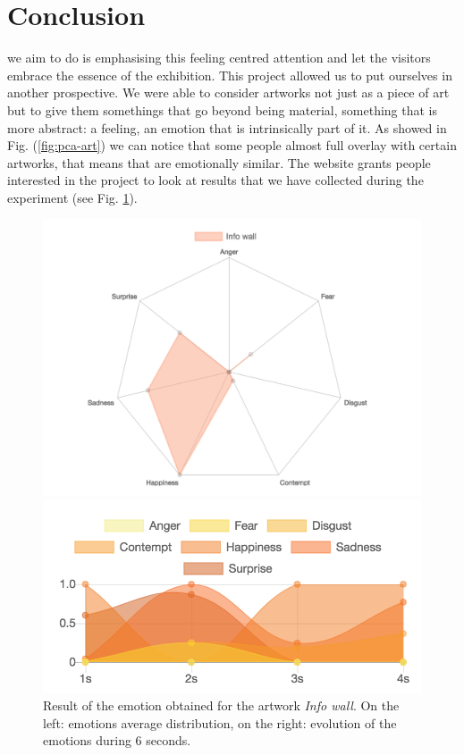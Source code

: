\documentclass[journal, a4paper]{IEEEtran}
\begin{document}
\section{Conclusion}
 we aim to do is emphasising this feeling centred attention and let the visitors embrace the essence of the exhibition. This project allowed us to put ourselves in another prospective. We were able to consider artworks not just as a piece of art but to give them somethings that go beyond being material, something that is more abstract: a feeling, an emotion that is intrinsically part of it. As showed in Fig. (\ref{fig:pca-art}) we can notice that some people almost full overlay with certain artworks, that means that are emotionally similar. The website grants people interested in the project to look at results that we have collected during the experiment (see Fig. \ref{fig:charttime}).
\begin{figure}[!h]
  \centering
  \begin{minipage}[b]{0.24\textwidth}
    \includegraphics[width=\textwidth]{chart.png}
  \end{minipage}
  \hfill
  \begin{minipage}[b]{0.24\textwidth}
    \includegraphics[width=\textwidth]{emot.png}
  \end{minipage}
  \caption{Result of the emotion obtained for the artwork \textit{Info wall}. On the left: emotions average distribution, on the right: evolution of the emotions during 6 seconds.}
  \label{fig:charttime}
\end{figure}
\end{document}
